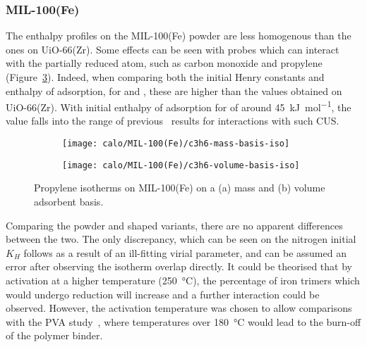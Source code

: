
\subsubsection{MIL-100(Fe)}

The enthalpy profiles on the MIL-100(Fe) powder are less homogenous
than the ones on UiO-66(Zr). Some effects can be seen with probes which
can interact with the partially reduced  atom, such as 
carbon monoxide and propylene (Figure~\ref{fgr:shaping:mil100isotherms}).
Indeed, when comparing both the initial Henry constants and 
enthalpy of adsorption, for  and , these are 
higher than the values obtained on UiO-66(Zr).
With initial enthalpy of adsorption for  of around
\SI{45}{\kilo\joule\per\mol}, the value falls into the range of
previous~\cite{yoonControlledReducibilityMetalOrganic2010}
results for interactions with such  CUS.

\begin{figure}[!htb]
    \begin{subfigure}{0.5\textwidth}
        \texttt{[image: calo/MIL-100(Fe)/c3h6-mass-basis-iso]}
        \caption{}%
        \label{fgr:shaping:mil100c3h6adsmol}
    \end{subfigure}
    \begin{subfigure}{0.5\textwidth}
        \texttt{[image: calo/MIL-100(Fe)/c3h6-volume-basis-iso]}
        \caption{}%
        \label{fgr:shaping:mil100c3h6adsvol}
    \end{subfigure}%
    \caption{Propylene isotherms on MIL-100(Fe) on a (a) mass
    and (b) volume adsorbent basis.}%
    \label{fgr:shaping:mil100isotherms}
\end{figure}

Comparing the powder and shaped variants, there are no 
apparent differences between the two. The only discrepancy, 
which can be seen on the nitrogen initial \(K_H\) follows 
as a result of an ill-fitting virial parameter,
and can be assumed an error after observing the isotherm 
overlap directly. It could be theorised that by activation at
a higher temperature (\SI{250}{\degreeCelsius}),
the percentage of iron trimers which would undergo reduction will 
increase and a further interaction could be observed. 
However, the activation temperature was chosen to allow 
comparisons with the PVA study~\cite{chanutObservingEffectsShaping2016},
where temperatures over \SI{180}{\degreeCelsius} would lead to the 
burn-off of the polymer binder.

